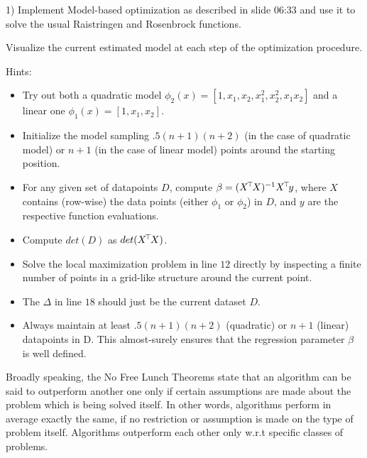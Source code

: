 

\renewcommand{\course}{Optimization}
\renewcommand{\coursepicture}{optim}
\renewcommand{\coursedate}{Summer 2015}
\renewcommand{\exnum}{11}

\exercises



1) Implement Model-based optimization as described in slide 06:33 and use it to
solve the usual Raistringen and Rosenbrock functions.

Visualize the current estimated model at each step of the optimization procedure.

Hints:
\begin{itemize}
  \item Try out both a quadratic model $\phi_2(x) = [ 1, x_1, x_2, x_1^2, x_2^2, x_1x_2 ]$ and a linear one $\phi_1(x) = [1, x_1, x_2 ]$.
  \item Initialize the model sampling $.5 (n+1)(n+2)$ (in the case of quadratic model) or $n+1$ (in the case of linear model) points around the starting position.
  \item For any given set of datapoints $D$, compute $\beta = (X^{\!\top\!} X)^{-1} X^{\!\top\!} y$, where $X$ contains (row-wise) the data points (either $\phi_1$ or $\phi_2$) in $D$, and $y$ are the respective function evaluations.
  \item Compute $det(D)$ as $det(X^{\!\top\!} X)$.
  \item Solve the local maximization problem in line $12$ directly by inspecting a finite number of points in a grid-like structure around the current point.
  \item The $\Delta$ in line $18$ should just be the current dataset $D$.
  \item Always maintain at least $.5 (n+1)(n+2)$ (quadratic) or $n+1$ (linear) datapoints in D. This almost-surely ensures that the regression parameter $\beta$ is well defined.
\end{itemize}



Broadly speaking, the No Free Lunch Theorems state that an algorithm can be
said to outperform another one only if certain assumptions are made about the
problem which is being solved itself.  In other words, algorithms perform in
average exactly the same, if no restriction or assumption is made on the type
of problem itself.  Algorithms outperform each other only w.r.t specific
classes of problems.

